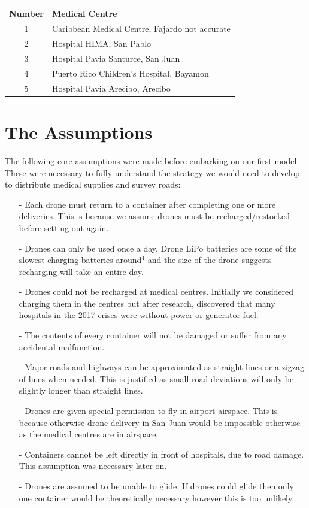 \documentclass[a4paper,12pt]{article}
\begin{document}
\begin{center}
\begin{tabular}{ |c|l| }
 \hline
 Number & Medical Centre  \\\hline
 1 & Caribbean Medical Centre, Fajardo not accurate  \\
 2 & Hospital HIMA, San Pablo \\
 3 & Hospital Pavia Santurce, San Juan \\
 4 & Puerto Rico Children's Hospital, Bayamon \\
 5 & Hospital Pavia Arecibo, Arecibo  \\
 \hline
\end{tabular}
\end{center}

\section{The Assumptions}
The following core assumptions were made before embarking on our first model. These were necessary to fully understand the strategy we would
need to develop to distribute medical supplies and survey roads:

\begin{itemize}
\item[-]Each drone must return to a container after completing one or more deliveries.
        This is because we assume drones must be recharged/restocked before setting out again.
\item[-]Drones can only be used once a day. Drone LiPo batteries are some of the slowest charging batteries around$^{4}$ and
        the size of the drone suggests recharging will take an entire day.
\item[-]Drones could not be recharged at medical centres.
        Initially we considered charging them in the centres but after research, discovered that
        many hospitals in the 2017 crises were without power or generator fuel.
\item[-]The contents of every container will not be damaged or suffer from any accidental malfunction.
\item[-]Major roads and highways can be approximated as straight lines or a zigzag of lines when needed. This is justified as small road deviations will only be slightly longer than straight lines.
\item[-]Drones are given special permission to fly in airport airspace. This is because otherwise drone delivery in San Juan would be impossible otherwise as the medical centres are in airspace.
\item[-]Containers cannot be left directly in front of hospitals, due to road damage. This assumption was necessary later on.
\item[-]Drones are assumed to be unable to glide. If drones could glide then only one container would be theoretically necessary however this is too unlikely.
\end{itemize}
\end{document}
